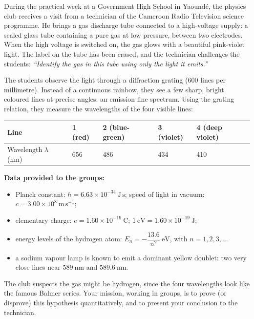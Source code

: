 \documentclass[11pt]{article}
\newcommand{\cle}[1]{{\popxbold\color{popdark}#1}}
\newcounter{popsec}
\newcounter{popsub}
\newcommand{\courssub}[1]{%
  \stepcounter{popsub}%
  \par\vspace{9pt}\noindent{\popxbold\fontsize{11.5}{13}\selectfont\color{popink}{\color{poporange}\thepopsec.\thepopsub}\hspace{6pt}#1}\par\nopagebreak\vspace{4pt}
}
\begin{document}
\courssub{Situation}
\begin{experience}
During the practical week at a Government High School in Yaound\'e, the physics club receives a visit from a technician of the Cameroon Radio Television science programme. He brings a \cle{gas discharge tube} connected to a high-voltage supply: a sealed glass tube containing a pure gas at low pressure, between two electrodes. When the high voltage is switched on, the gas glows with a beautiful pink-violet light. The label on the tube has been erased, and the technician challenges the students: \emph{``Identify the gas in this tube using only the light it emits.''}

The students observe the light through a \cle{diffraction grating} (600 lines per millimetre). Instead of a continuous rainbow, they see a few sharp, bright coloured lines at precise angles: an \cle{emission line spectrum}. Using the grating relation, they measure the wavelengths of the four visible lines:

\begin{center}
\begin{tabularx}{\linewidth}{|l|X|X|X|X|}
\hline
\rowcolor{popblueL} Line & 1 (red) & 2 (blue-green) & 3 (violet) & 4 (deep violet) \\
\hline
Wavelength $\lambda$ (nm) & 656 & 486 & 434 & 410 \\
\hline
\end{tabularx}
\end{center}

\textbf{Data provided to the groups:}
\begin{itemize}
\item Planck constant: $h = 6.63\times 10^{-34}\ \mathrm{J\,s}$; speed of light in vacuum: $c = 3.00\times 10^{8}\ \mathrm{m\,s^{-1}}$;
\item elementary charge: $e = 1.60\times 10^{-19}\ \mathrm{C}$; $1\ \mathrm{eV} = 1.60\times 10^{-19}\ \mathrm{J}$;
\item energy levels of the hydrogen atom: $E_n = -\dfrac{13.6}{n^2}\ \mathrm{eV}$, with $n = 1, 2, 3, \dots$
\item a sodium vapour lamp is known to emit a dominant \cle{yellow doublet}: two very close lines near $589\ \mathrm{nm}$ and $589.6\ \mathrm{nm}$.
\end{itemize}

The club suspects the gas might be hydrogen, since the four wavelengths look like the famous \cle{Balmer series}. Your mission, working in groups, is to prove (or disprove) this hypothesis quantitatively, and to present your conclusion to the technician.
\end{experience}
\end{document}
